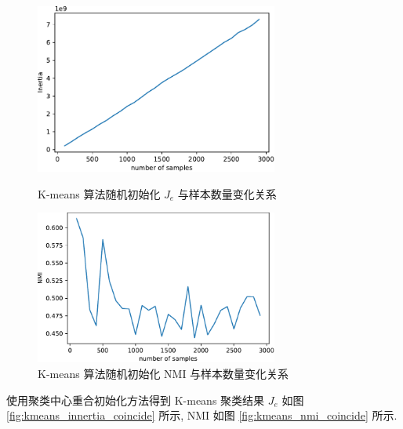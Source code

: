 \documentclass[openany]{ctexbook}
\theoremstyle{kaiti}
\theoremstyle{normal}
\begin{document}
\begin{figure}[htbp]
  \centering
  \begin{minipage}[t]{0.48\textwidth}
    \centering
    \includegraphics[width=8cm]{kmeans_innertia.pdf}
    \caption{K-means 算法随机初始化 $J_e$ 与样本数量变化关系}
    \label{fig:kmeans_innertia}
  \end{minipage}
  \begin{minipage}[t]{0.48\textwidth}
    \centering
    \includegraphics[width=8cm]{kmeans_nmi.pdf}
    \caption{K-means 算法随机初始化 NMI 与样本数量变化关系}
    \label{fig:kmeans_nmi}
  \end{minipage}
\end{figure}

使用聚类中心重合初始化方法得到 K-means 聚类结果 $J_e$ 如图 \ref{fig:kmeans_innertia_coincide} 所示, NMI 如图 \ref{fig:kmeans_nmi_coincide} 所示.
\end{document}
